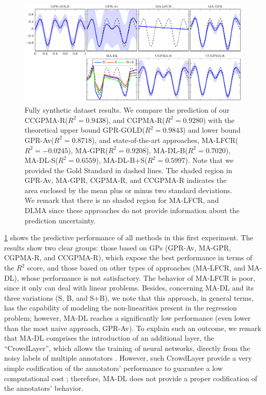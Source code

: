 \documentclass[journal]{IEEEtran}
\begin{document}
% 	    
\begin{figure}[!tb]
	\centering
% 	
	\includegraphics[width = \textwidth]{Figures/SinReg.pdf}
	\caption{Fully synthetic dataset results. We compare the prediction of our CCGPMA-R($R^2=0.9438$), and CGPMA-R($R^2=0.9280$) with the theoretical upper bound GPR-GOLD($R^2=0.9843$) and lower bound GPR-Av($R^2=0.8718$), and state-of-the-art approaches, MA-LFCR($R^2=-0.0245$), MA-GPR($R^2=0.9208$),  MA-DL-B($R^2=0.7020$), MA-DL-S($R^2=0.6559$), MA-DL-B+S($R^2=0.5997$). Note that we provided the Gold Standard in dashed lines. The shaded region in GPR-Av, MA-GPR, CGPMA-R, and CCGPMA-R indicates the area enclosed by the mean plus or minus two standard deviations. We remark that there is no shaded region for MA-LFCR, and DLMA since these approaches do not provide information about the prediction uncertainty.}
	\label{fig:FSReg}
\end{figure}
\cref{fig:FSReg} shows the predictive performance of all methods in this first experiment. The results show two clear groups: those based on GPs (GPR-Av, MA-GPR, CGPMA-R, and CCGPMA-R), which expose the best performance in terms of the $R^2$ score, and those based on other types of approaches (MA-LFCR, and MA-DL), whose performance is not satisfactory. The behavior of MA-LFCR is poor, since it only can deal with linear problems. Besides, concerning MA-DL and its three variations (S, B, and S+B), we note that this approach, in general terms, has the capability of modeling the non-linearities present in the regression problem; however, MA-DL reaches a significantly low performance (even lower than the most naive approach, GPR-Av). To explain such an outcome, we remark that MA-DL comprises the introduction of an additional layer, the ``CrowdLayer'', which allows the training of neural networks, directly from the noisy labels of multiple annotators \cite{rodrigues2018deep}. However, such CrowdLayer provide a very simple codification of the annotators' performance to guarantee a low computational cost \cite{morales2019scalable1}; therefore, MA-DL does not provide a proper codification of the annotators' behavior. \\
\end{document}
